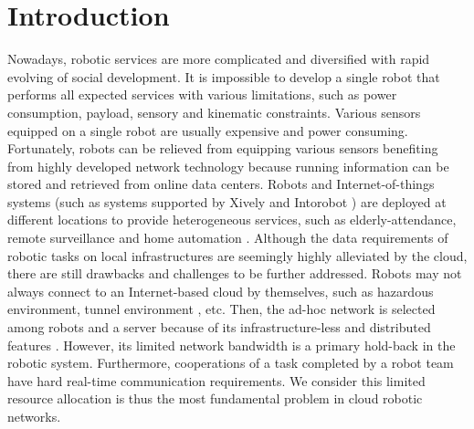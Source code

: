 \documentclass[journal]{IEEEtran}  %
\begin{document}
\section{Introduction}
\label{intro}
Nowadays, robotic services are more complicated and diversified with rapid
evolving of social development.
It is impossible to develop a single robot that performs all expected services
with various limitations, such as power consumption, payload, sensory and
kinematic constraints. 
Various sensors equipped on a single robot are usually expensive
and power consuming.
Fortunately, robots can be relieved from equipping various sensors benefiting
from highly developed network technology because running information can be
stored and retrieved from online data centers.
Robots and Internet-of-things systems (such as systems supported by Xively
      \texttrademark and Intorobot \texttrademark) are deployed at different
locations to provide heterogeneous services, such as elderly-attendance, remote
surveillance and home automation \cite{wang2008robust}.
Although the data requirements of robotic tasks on local infrastructures are 
seemingly highly alleviated by the cloud, there are still drawbacks and
challenges to be further addressed.
Robots may not always connect to an Internet-based cloud by themselves, such as
hazardous environment, tunnel environment \cite{Rizzo18092013}, etc.
Then, the ad-hoc network is selected among robots and a server because of its 
infrastructure-less and distributed features \cite{sheng2012localisation}. 
However, its limited network bandwidth is a primary hold-back in the robotic system.
Furthermore, cooperations of a task completed by a robot team have hard 
real-time communication requirements.
We consider this limited resource allocation is thus the most fundamental
problem in cloud robotic networks.

\end{document}
